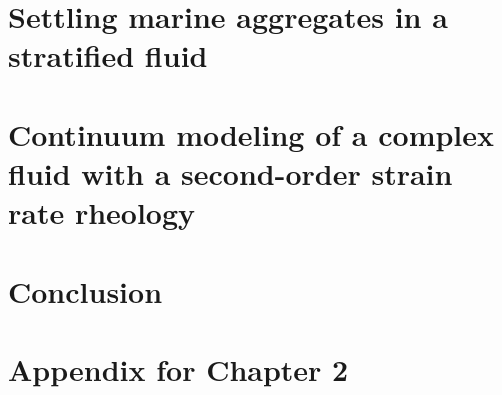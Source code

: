 \documentclass[11pt,oneside,chapterheads]{UCMerced}
\theoremstyle{plain}%
\theoremstyle{definition}
\begin{document}

\chapter{Settling marine aggregates in a stratified fluid}
\label{ch:3}
 

\chapter{Continuum modeling of a complex fluid with a second-order strain rate rheology}
\label{ch:4}
 

\chapter{Conclusion}
\label{ch:conclusion}
 

\printbibliography

\appendix
\chapter{Appendix for Chapter 2}

\end{document}
